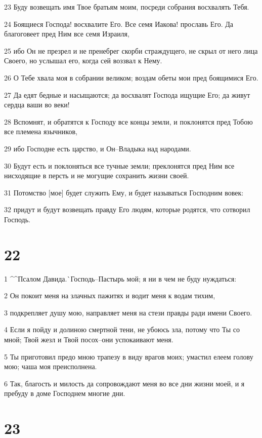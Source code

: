 \par 23 Буду возвещать имя Твое братьям моим, посреди собрания восхвалять Тебя.
\par 24 Боящиеся Господа! восхвалите Его. Все семя Иакова! прославь Его. Да благоговеет пред Ним все семя Израиля,
\par 25 ибо Он не презрел и не пренебрег скорби страждущего, не скрыл от него лица Своего, но услышал его, когда сей воззвал к Нему.
\par 26 О Тебе хвала моя в собрании великом; воздам обеты мои пред боящимися Его.
\par 27 Да едят бедные и насыщаются; да восхвалят Господа ищущие Его; да живут сердца ваши во веки!
\par 28 Вспомнят, и обратятся к Господу все концы земли, и поклонятся пред Тобою все племена язычников,
\par 29 ибо Господне есть царство, и Он--Владыка над народами.
\par 30 Будут есть и поклоняться все тучные земли; преклонятся пред Ним все нисходящие в персть и не могущие сохранить жизни своей.
\par 31 Потомство [мое] будет служить Ему, и будет называться Господним вовек:
\par 32 придут и будут возвещать правду Его людям, которые родятся, что сотворил Господь.

\chapter{22}

\par 1 ^^Псалом Давида.^^ Господь--Пастырь мой; я ни в чем не буду нуждаться:
\par 2 Он покоит меня на злачных пажитях и водит меня к водам тихим,
\par 3 подкрепляет душу мою, направляет меня на стези правды ради имени Своего.
\par 4 Если я пойду и долиною смертной тени, не убоюсь зла, потому что Ты со мной; Твой жезл и Твой посох--они успокаивают меня.
\par 5 Ты приготовил предо мною трапезу в виду врагов моих; умастил елеем голову мою; чаша моя преисполнена.
\par 6 Так, благость и милость да сопровождают меня во все дни жизни моей, и я пребуду в доме Господнем многие дни.

\chapter{23}

